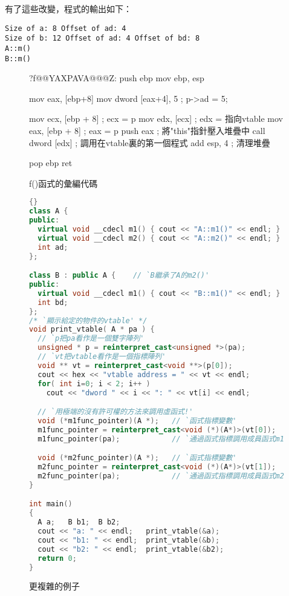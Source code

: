 有了這些改變，程式的輸出如下：
\begin{verbatim}
Size of a: 8 Offset of ad: 4
Size of b: 12 Offset of ad: 4 Offset of bd: 8
A::m()
B::m()
\end{verbatim}


\begin{figure}[tp]
\begin{AsmCodeListing}[commentchar=!]
?f@@YAXPAVA@@@Z:
      push   ebp
      mov    ebp, esp

      mov    eax, [ebp+8]
      mov    dword [eax+4], 5  ; p->ad = 5;

      mov    ecx, [ebp + 8]    ; ecx = p
      mov    edx, [ecx]        ; edx = 指向vtable
      mov    eax, [ebp + 8]    ; eax = p
      push   eax               ; 將"this"指針壓入堆疊中
      call   dword [edx]       ; 調用在vtable裏的第一個程式
      add    esp, 4            ; 清理堆疊

      pop    ebp
      ret
\end{AsmCodeListing}
\caption{{\code f()}函式的彙編代碼 \label{fig:FAsm2}}
\end{figure}

\begin{figure}[tp]
\lstset{escapeinside=`',language=Pascal,%
}
\begin{lstlisting}[language=C++, frame=tlrb]{}
class A {
public:
  virtual void __cdecl m1() { cout << "A::m1()" << endl; }
  virtual void __cdecl m2() { cout << "A::m2()" << endl; }
  int ad;
};

class B : public A {    // `B繼承了A的m2()'
public:
  virtual void __cdecl m1() { cout << "B::m1()" << endl; }
  int bd;
};
/* `顯示給定的物件的vtable' */
void print_vtable( A * pa ) {
  // `p把pa看作是一個雙字陣列'
  unsigned * p = reinterpret_cast<unsigned *>(pa);
  // `vt把vtable看作是一個指標陣列'
  void ** vt = reinterpret_cast<void **>(p[0]);
  cout << hex << "vtable address = " << vt << endl;
  for( int i=0; i < 2; i++ )
    cout << "dword " << i << ": " << vt[i] << endl;

  // `用極端的沒有許可權的方法來調用虛函式!'
  void (*m1func_pointer)(A *);   // `函式指標變數'
  m1func_pointer = reinterpret_cast<void (*)(A*)>(vt[0]);
  m1func_pointer(pa);            // `通過函式指標調用成員函式m1'

  void (*m2func_pointer)(A *);   // `函式指標變數'
  m2func_pointer = reinterpret_cast<void (*)(A*)>(vt[1]);
  m2func_pointer(pa);            // `通過函式指標調用成員函式m2'
}

int main()
{
  A a;   B b1;  B b2;
  cout << "a: " << endl;   print_vtable(&a);
  cout << "b1: " << endl;  print_vtable(&b);
  cout << "b2: " << endl;  print_vtable(&b2);
  return 0;
}
\end{lstlisting}
\caption{ 更複雜的例子 \label{fig:2mEx}}
\end{figure}


